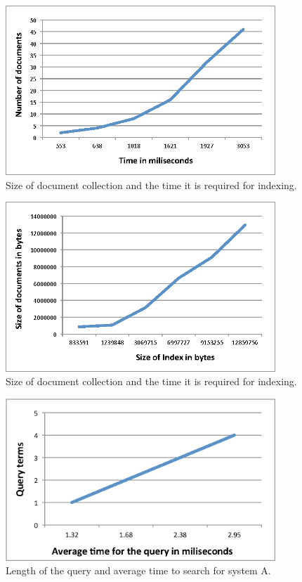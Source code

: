 \documentclass[letterpaper,10pt]{article}
\begin{document}
\begin{figure}[H]
    \centering
    \includegraphics[width=4in]{docNumber-Time.eps}
    \caption{ Size of document collection and the time it is required for indexing. }
    \label{Query structure}
\end{figure}

\begin{figure}[H]
    \centering
    \includegraphics[width=4in]{docSize-Time.eps}
    \caption{ Size of document collection and the time it is required for indexing. }
    \label{Query structure}
\end{figure}

\begin{figure}[H]
    \centering
    \includegraphics[width=4in]{queryterms-timeA.eps}
    \caption{ Length of the query and average time to search for system A. }
    \label{Query structure}
\end{figure}
\end{document}
